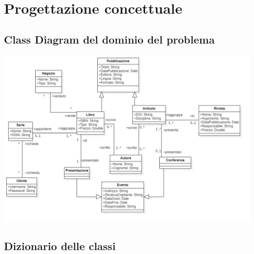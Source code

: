 \chapter{Progettazione concettuale}
    \section{Class Diagram del dominio del problema}

    \includegraphics[scale=0.25, center]{Immagini/CD_dominio_del_problema.png}
        
        \newpage

    \section{Dizionario delle classi}

